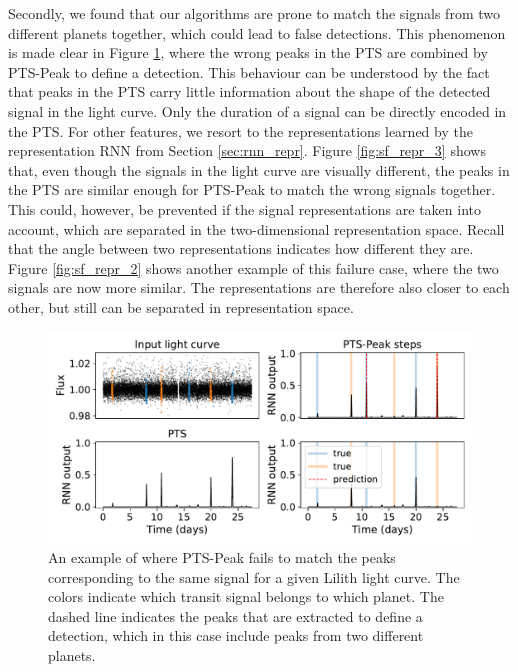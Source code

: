 Secondly,  we found that our algorithms are prone to match the signals from two different planets together, which could lead to false detections. This phenomenon is made clear in Figure \ref{fig:sf_multi_not_peak}, where the wrong peaks in the PTS are combined by PTS-Peak to define a detection. This behaviour can be understood by the fact that peaks in the PTS carry little information about the shape of the detected signal in the light curve. Only the duration of a signal can be directly encoded in the PTS. For other features, we resort to the representations learned by the representation RNN from Section \ref{sec:rnn_repr}. Figure \ref{fig:sf_repr_3} shows that, even though the signals in the light curve are visually different, the peaks in the PTS are similar enough for PTS-Peak to match the wrong signals together. This could, however, be prevented if the signal representations are taken into account, which are separated in the two-dimensional representation space. Recall that the angle between two representations indicates how different they are. Figure \ref{fig:sf_repr_2} shows another example of this failure case, where the two signals are now more similar. The representations are therefore also closer to each other, but still can be separated in representation space.

\begin{figure}
    \centering
    \includegraphics[width=0.6\linewidth]{Experiments/Figures/Cases/sf_multi_not_peak_2.pdf}
    \caption{An example of where PTS-Peak fails to match the peaks corresponding to the same signal for a given Lilith light curve. The colors indicate which transit signal belongs to which planet. The dashed line indicates the peaks that are extracted to define a detection, which in this case include peaks from two different planets.}
    \label{fig:sf_multi_not_peak}
\end{figure}

